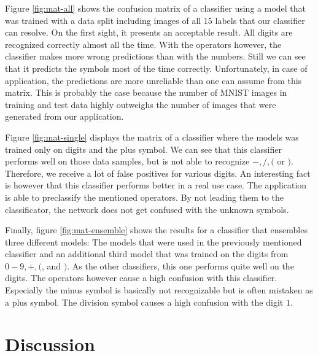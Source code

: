 \documentclass[11pt]{article}
\begin{document}
	Figure \ref{fig:mat-all} shows the confusion matrix of a classifier using a model that was trained with a data split including images of all 15 labels that our classifier can resolve. On the first sight, it presents an acceptable result. All digits are recognized correctly almost all the time. With the operators however, the classifier makes more wrong predictions than with the numbers. Still we can see that it predicts the symbols most of the time correctly. Unfortunately, in case of application, the predictions are more unreliable than one can assume from this matrix. This is probably the case because the number of MNIST images in training and test data highly outweighs the number of images that were generated from our application.
	
	Figure \ref{fig:mat-single} displays the matrix of a classifier where the models was trained only on digits and the plus symbol. We can see that this classifier performs well on those data samples, but is not able to recognize $-, /, ($ or $)$. Therefore, we receive a lot of false positives for various digits. An interesting fact is however that this classifier performs better in a real use case. The application is able to preclassify the mentioned operators. By not leading them to the classificator, the network does not get confused with the unknown symbols.
	
	Finally, figure \ref{fig:mat-ensemble} shows the results for a classifier that ensembles three different models: The models that were used in the previously mentioned classifier and an additional third model that was trained on the digits from $0-9, +, ($, and $)$. As the other classifiers, this one performs quite well on the digits. The operators however cause a high confusion with this classifier. Especially the minus symbol is basically not recognizable but is often mistaken as a plus symbol. The division symbol causes a high confusion with the digit $1$.
	
	\newpage

	\section{Discussion}
	
\end{document}
